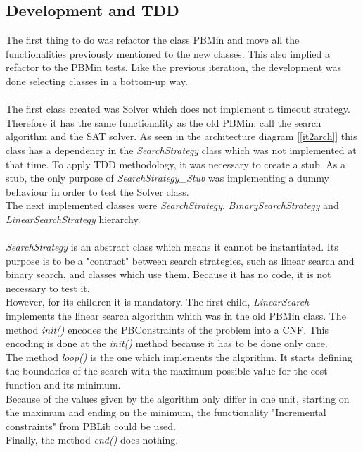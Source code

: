 \subsection{Development and TDD}
The first thing to do was refactor the class PBMin and move all the functionalities previously mentioned to the new classes. This also implied a refactor to the PBMin tests. Like the previous iteration, the development was done selecting classes in a bottom-up way.  \\\\
The first class created was Solver which does not implement a timeout strategy. Therefore it has the same functionality as the old PBMin: call the search algorithm and the SAT solver. As seen in the architecture diagram [\ref{it2arch}] this class has a dependency in the \emph{SearchStrategy} class which was not implemented at that time. To apply TDD methodology, it was necessary to create a stub. As a stub, the only purpose of \emph{SearchStrategy\_Stub} was implementing a dummy behaviour in order to test the Solver class. \\
The next implemented classes were \emph{SearchStrategy}, \emph{BinarySearchStrategy} and \emph{LinearSearchStrategy} hierarchy.  \\\\
\emph{SearchStrategy} is an abstract class which means it cannot be instantiated. Its purpose is to be a "contract" between search strategies, such as linear search and binary search, and classes which use them. Because it has no code, it is not necessary to test it.  \\
However, for its children it is mandatory. The first child, \emph{LinearSearch} implements the linear search algorithm which was in the old PBMin class. The method \emph{init()} encodes the PBConstraints of the problem into a CNF. This encoding is done at the \emph{init()} method because it has to be done only once.  \\
The method \emph{loop()} is the one which implements the algorithm. It starts defining the boundaries of the search with the maximum possible value for the cost function and its minimum.  \\
Because of the values given by the algorithm only differ in one unit, starting on the maximum and ending on the minimum, the functionality "Incremental constraints" from PBLib could be used.\\ %
Finally, the method \emph{end()} does nothing. \\
